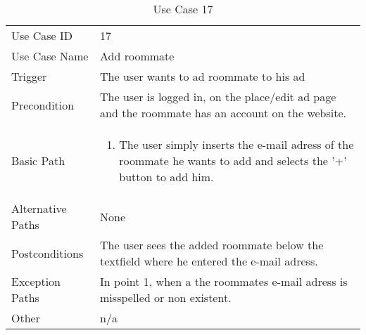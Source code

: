 \begin{table}[H]
\centering
\label{table-use-case-17}
\begin{tabular}{|p{3cm}|p{10cm}}
Use Case ID       & 17                                                      \\
Use Case Name     & Add roommate                            \\
Trigger           & The user wants to ad roommate to his ad\\
Precondition      & The user is logged in, on the place/edit ad page and the
roommate has an account on the website.
\\
Basic Path        & \begin{enumerate}
\item		The user simply inserts the e-mail adress of the roommate he wants to add
and selects the '+' button to add him.
\end{enumerate} 
     \\
Alternative Paths & None                          \\
Postconditions    & The user sees the added roommate below the textfield where
he entered the e-mail adress.
\\
Exception Paths   & In point 1, when a the roommates e-mail adress is misspelled
or non existent.
\\
Other             & n/a                                                                                                                                                                                                        
\end{tabular}
\caption{Use Case 17}
\end{table}


